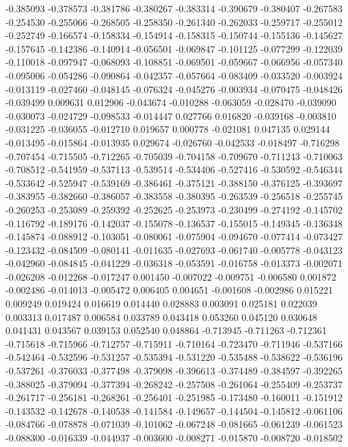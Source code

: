 -0.385093
-0.378573
-0.381786
-0.380267
-0.383314
-0.390679
-0.380407
-0.267583
-0.254530
-0.255066
-0.268505
-0.258350
-0.261340
-0.262033
-0.259717
-0.255012
-0.252749
-0.166574
-0.158334
-0.154914
-0.158315
-0.150744
-0.155136
-0.145627
-0.157645
-0.142386
-0.140914
-0.056501
-0.069847
-0.101125
-0.077299
-0.122039
-0.110018
-0.097947
-0.068093
-0.108851
-0.069501
-0.059667
-0.066956
-0.057340
-0.095006
-0.054286
-0.090864
-0.042357
-0.057664
-0.083409
-0.033520
-0.003924
-0.013119
-0.027460
-0.048145
-0.076324
-0.045276
-0.003934
-0.070475
-0.048426
-0.039499
0.009631
0.012906
-0.043674
-0.010288
-0.063059
-0.028470
-0.039090
-0.030073
-0.024729
-0.098533
-0.014447
0.027766
0.016820
-0.039168
-0.003810
-0.031225
-0.036055
-0.012710
0.019657
0.000778
-0.021081
0.047135
0.029144
-0.013495
-0.015864
-0.013935
0.029674
-0.026760
-0.042533
-0.018497
-0.716298
-0.707454
-0.715505
-0.712265
-0.705039
-0.704158
-0.709670
-0.711243
-0.710063
-0.708512
-0.541959
-0.537113
-0.539514
-0.534406
-0.527416
-0.530592
-0.546344
-0.533642
-0.525947
-0.539169
-0.386461
-0.375121
-0.388150
-0.376125
-0.393697
-0.383955
-0.382660
-0.386057
-0.383558
-0.380395
-0.263539
-0.256518
-0.255745
-0.260253
-0.253089
-0.259392
-0.252625
-0.253973
-0.230499
-0.274192
-0.145702
-0.116792
-0.189176
-0.142037
-0.155078
-0.136537
-0.155015
-0.149345
-0.136348
-0.145874
-0.088912
-0.103051
-0.080061
-0.075904
-0.094670
-0.077414
-0.073427
-0.123432
-0.084509
-0.080141
-0.011635
-0.027693
-0.061740
-0.005778
-0.043123
-0.042960
-0.084845
-0.041229
-0.036318
-0.053591
-0.016758
-0.013373
-0.002071
-0.026208
-0.012268
-0.017247
0.001450
-0.007022
-0.009751
-0.006580
0.001872
-0.002486
-0.014013
-0.005472
0.006405
0.004651
-0.001608
-0.002986
0.015221
0.009249
0.019424
0.016619
0.014440
0.028883
0.003091
0.025181
0.022039
0.003313
0.017487
0.006584
0.033789
0.043418
0.053260
0.045120
0.030648
0.041431
0.043567
0.039153
0.052540
0.048864
-0.713945
-0.711263
-0.712361
-0.715618
-0.715966
-0.712757
-0.715911
-0.710164
-0.723470
-0.711946
-0.537166
-0.542464
-0.532596
-0.531257
-0.535394
-0.531220
-0.535488
-0.538622
-0.536196
-0.537261
-0.376033
-0.377498
-0.379098
-0.396613
-0.374489
-0.384597
-0.392265
-0.388025
-0.379094
-0.377394
-0.268242
-0.257508
-0.261064
-0.255409
-0.253737
-0.261717
-0.256181
-0.268261
-0.256401
-0.251985
-0.173480
-0.160011
-0.151912
-0.143532
-0.142678
-0.140538
-0.141584
-0.149657
-0.144504
-0.145812
-0.061106
-0.084766
-0.078878
-0.071039
-0.101062
-0.067248
-0.081665
-0.061239
-0.061523
-0.088300
-0.016339
-0.044937
-0.003600
-0.008271
-0.015870
-0.008720
-0.018502

